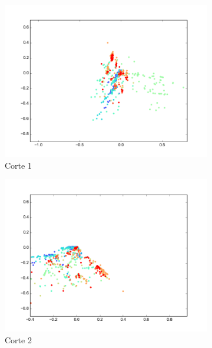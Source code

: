 \begin{figure}[H]
        \begin{subfigure}[b]{0.33\textwidth}
                \includegraphics[width=\linewidth]{secciones/graficos/sanger/eje1_train.png}
                \caption{Corte 1}
                \label{fig: ej1_sanger_eje_1_train}
        \end{subfigure}
        \begin{subfigure}[b]{0.33\textwidth}
                \includegraphics[width=\linewidth]{secciones/graficos/sanger/eje2_train.png}
                \caption{Corte 2}
                \label{fig: ej1_sanger_eje_2_train}
        \end{subfigure}
        \begin{subfigure}[b]{0.33\textwidth}

\end{subfigure}
\end{figure}
